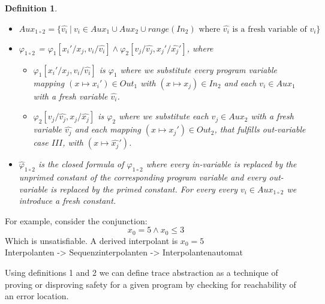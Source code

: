 \documentclass{article}
\newcommand{\invars}{\ensuremath{In}\xspace}
\newcommand{\outvars}{\ensuremath{Out}\xspace}
\newcommand{\auxvars}{\ensuremath{Aux}\xspace}
\newtheorem{mydef}{Definition}
\newcommand\mycom[1]{}
\newcommand\mycom[1]{#1}
\newcommand{\jw}[1]{\mycom{\todo[color=blue!40,inline]{\small JW: #1}}}
\begin{document}
\begin{mydef}
\begin{itemize}
		\item $\auxvars_{1 \circ 2} = \{ \widehat{v_i} \ |\ v_i \in \auxvars_1 \cup \auxvars_2 \cup range(\invars_2) \text{ where } \widehat{v_i} \text{ is a fresh variable of } v_i \}$
		\item $\varphi_{1 \circ 2}$ = $\varphi_1[x_i' / x_j, v_i / \widehat{v_i} ] \land \varphi_2[v_j / \widehat{v_j}, x_j' / \widehat{x_j}']$, where
		\begin{itemize}
			\item $\varphi_1[x_i' / x_j, v_i / \widehat{v_i} ] $ is $\varphi_1$ where we substitute every program variable mapping $(x \mapsto x_i') \in \outvars_1$ with $(x \mapsto x_j) \in \invars_2$ and each $v_i \in \auxvars_1$ with a fresh variable $\widehat{v_i}$.
			\item  $\varphi_2[v_j / \widehat{v_j}, x_j / \widehat{x_j}]$ is $\varphi_2$ where we substitute each $v_j \in \auxvars_2$ with a fresh variable $\widehat{v_j}$ and each mapping $(x \mapsto x_j') \in \outvars_2$, that fulfills out-variable case $III$, with $(x \mapsto \widehat{x_j}')$.
		\end{itemize} 
		\item $\widehat{\varphi}_{1 \circ 2}$ is the closed formula of $\varphi_{1 \circ 2}$ where every in-variable is replaced by the unprimed constant of the corresponding program variable and every out-variable is replaced by the primed constant. For every every $v_i \in \auxvars_{1 \circ 2}$ we introduce a fresh constant.
	\end{itemize}
\end{mydef}

\jw{Todo Interpolants}
For example, consider the conjunction:
\begin{equation}
	x_0 = 5 \land x_0 \leq 3
\end{equation}
Which is unsatisfiable. A derived interpolant is $x_0 = 5$ \\
	Interpolanten -> Sequenzinterpolanten \cite{10.1007/11691372_33}-> Interpolantenautomat

\vspace*{2cm}



Using definitions 1 and 2 we can define trace abstraction as a technique of proving or disproving safety for a given program by checking for reachability of an error location.
\end{document}
